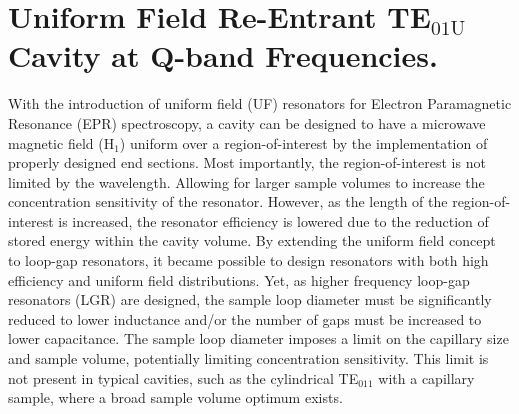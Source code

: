 \chapter[Uniform Field TE01U Cavity at Q-band Frequencies]{Uniform Field Re-Entrant TE$_{01\text{U}}$ Cavity at Q-band Frequencies.}

With the introduction of uniform field (UF) resonators for Electron Paramagnetic Resonance (EPR) spectroscopy, a cavity can be designed to have a microwave magnetic field (H$_1$) uniform over a region-of-interest by the implementation of properly designed end sections. \cite{mett2001axially, anderson2002, mett2002recav, hyde2004cavity} Most importantly, the region-of-interest is not limited by the wavelength. Allowing for larger sample volumes to increase the concentration sensitivity of the resonator. However, as the length of the region-of-interest is increased, the resonator efficiency is lowered due to the reduction of stored energy within the cavity volume. By extending the uniform field concept to loop-gap resonators,\cite{UFLGR} it became possible to design resonators with both high efficiency and uniform field distributions. \cite{UFLGR2017}  
Yet, as higher frequency loop-gap resonators (LGR) are designed, the sample loop diameter must be significantly reduced to lower inductance and/or the number of gaps must be increased to lower capacitance. \cite{Sidabras2007, MainaliLGR, UFLGR2017} The sample loop diameter imposes a limit on the capillary size and sample volume, potentially limiting concentration sensitivity. This limit is not present in typical cavities, such as the cylindrical TE$_{011}$ with a capillary sample, where a broad sample volume optimum exists. \cite{Nesmelov2004} 

